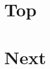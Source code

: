 \documentclass{amsart}
\begin{document}
\section{Top}\label{ed-0100}
\section{Next}\label{ed-0103}
\end{document}
